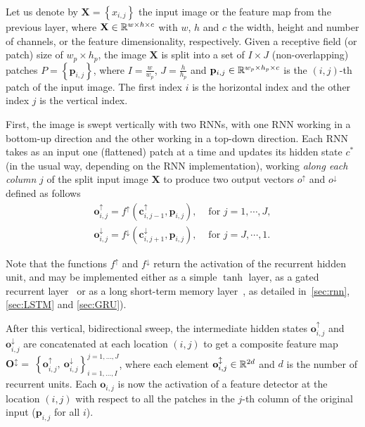 Let us denote by $\mathbf{X}=\left\{x_{i,j}\right\}$ the input image or the
feature map from the previous layer, where $\mathbf{X} \in \mathbb{R}^{w \times h
\times c}$ with $w$, $h$ and $c$ the width, height and number of channels, or
the feature dimensionality, respectively. Given a receptive field (or patch)
size of $w_p \times h_p$, the image $\mathbf{X}$ is split into a set of
$I \times J$ (non-overlapping) patches $P = \left\{ \mathbf{p}_{i,j} \right\}$,
where $I = \frac{w}{w_p}$, $J = \frac{h}{h_p}$ and $\mathbf{p}_{i,j} \in
\mathbb{R}^{w_p \times h_p \times c}$ is the $(i,j)$-th patch of the input image. The
first index $i$ is the horizontal index and the other index $j$ is the vertical
index.

First, the image is swept vertically with two RNNs, with one RNN working in a
bottom-up direction and the other working in a top-down direction.  Each RNN
takes as an input one (flattened) patch at a time and updates its hidden state
$c^*$ (in the usual way, depending on the RNN implementation), working
\emph{along each column} $j$ of the split input image $\mathbf{X}$ to produce
two output vectors $o^{\uparrow}$ and $o^{\downarrow}$ defined as follows
\begin{align}
    \mathbf{o}^{\uparrow}_{i,j} = f^\uparrow(\mathbf{c}^{\uparrow}_{
        i,j-1},\mathbf{p}_{i,j}), &\text{ for }j=1,\cdots, J,\\
    \mathbf{o}^{\downarrow}_{i,j} = f^\downarrow(\mathbf{c}^{\downarrow}_{
        i,j+1},\mathbf{p}_{i,j}), &\text{ for }j=J,\cdots,1.
\end{align}

\noindent Note that the functions $f^\uparrow$ and $f^\downarrow$ return the
activation of the recurrent hidden unit, and may be implemented either as a
simple $\tanh$ layer, as a gated recurrent layer~\citep{Cho2014} or as a long
short-term memory layer~\citep{Hochreiter+Schmidhuber-1997}, as detailed
in~\autoref{sec:rnn}, \autoref{sec:LSTM} and \autoref{sec:GRU}).

After this vertical, bidirectional sweep, the intermediate hidden states
$\mathbf{o}^{\uparrow}_{i,j}$ and $\mathbf{o}^{\downarrow}_{i,j}$ are
concatenated at each location $(i,j)$ to get a composite feature map
$\mathbf{O}^\updownarrow=~\left\{\mathbf{o}_{i,j}^{\uparrow},~\mathbf{o}_{i,j}^
{\downarrow}\right\}_{i=1,\ldots,I}^{j=1,\ldots,J}$, where each element
$\mathbf{o}^\updownarrow_{i,j} \in \mathbb{R}^{2d}$ and $d$ is the number of recurrent
units. Each $\mathbf{o}_{i,j}$ is now the activation of a feature detector at
the location $(i,j)$ with respect to all the patches in the $j$-th column of
the original input ($\mathbf{p}_{i, j}$ for all $i$).

